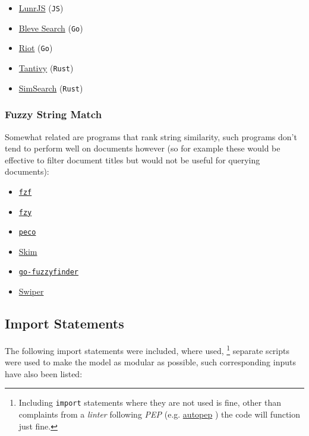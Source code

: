 \documentclass[a4paper,11pt,twoside]{article}
\begin{document}
\begin{itemize}
\item \href{https://github.com/olivernn/lunr.js/}{LunrJS}  (\texttt{JS}) \cite{nightingaleOlivernnLunrJs2021}
\item \href{https://github.com/blevesearch/bleve}{Bleve Search} (\texttt{Go}) \cite{martyschochBleveSearchDocumentation}
\item \href{https://github.com/go-ego/riot}{Riot} (\texttt{Go}) \cite{vzGoegoRiot2021}
\item \href{https://github.com/tantivy-search/tantivy}{Tantivy} (\texttt{Rust}) \cite{clementrenaultMeilisearchMeiliSearch2021}
\item \href{https://github.com/andylokandy/simsearch-rs}{SimSearch} (\texttt{Rust}) \cite{lokAndylokandySimsearchrs2021}
\end{itemize}


\subsubsection{Fuzzy String Match}
\label{sec:org6428af9}
Somewhat related are programs that rank string similarity, such programs don't tend
to perform well on documents however (so for example these would
be effective to filter document titles but would not be useful for
querying documents):

\begin{itemize}
\item \href{https://github.com/junegunn/fzf}{\texttt{fzf}} \cite{choiJunegunnFzf2021}
\item \href{https://github.com/jhawthorn/fzy}{\texttt{fzy}} \cite{hawthornJhawthornFzy2021}
\item \href{https://github.com/peco/peco}{\texttt{peco}} \cite{lestrratPecoPeco2021}
\item \href{https://github.com/lotabout/skim}{Skim} \cite{zhangLotaboutSkim2021}
\item \href{https://github.com/lotabout/skim}{\texttt{go-fuzzyfinder}} \cite{ktrKtr0731Gofuzzyfinder2021}
\item \href{https://github.com/lotabout/skim}{Swiper} \cite{krehelAboaboSwiper2021}
\end{itemize}

\subsection{Import Statements}
\label{sec:org61cc3f1}
The following import statements were included, where used, \footnote{Including \texttt{import} statements where they are not used is fine,
other than complaints from a \emph{linter} following \emph{PEP}
\cite{nickcoghlanPEPStyleGuide2001} (e.g. \href{https://pypi.org/project/autopep8/}{autopep}
\cite{hattoriAutopep8ToolThat}) the code will function just fine.}
separate scripts were used to make the model as modular as possible,
such corresponding inputs have also been listed:
\end{document}
